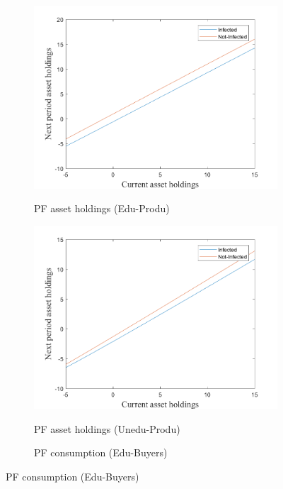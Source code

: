 \begin{figure}[H]
\bigskip
\begin{subfigure}{0.5\textwidth}\caption{PF asset holdings (Edu-Produ)}
   \includegraphics[width=\linewidth,height = 0.22\textheight]{figures/art/FIG3.png}
    \label{fig_dert}
\end{subfigure}
\hspace*{\fill}
\begin{subfigure}{0.5\textwidth}\caption{PF asset holdings (Unedu-Produ)}
   \includegraphics[width=\linewidth,height = 0.22\textheight]{figures/art/FIG4.png}
    \label{fig:x_b}
\end{subfigure}
\bigskip
\begin{subfigure}{0.5\textwidth}\caption{PF consumption (Edu-Buyers)}

\end{subfigure}
\end{figure}
